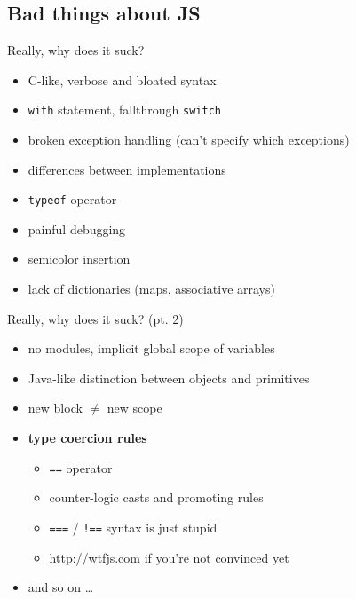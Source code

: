 \documentclass[xcolor=dvipsnames]{beamer}
\newcommand{\slide}[1]{\begin{frame}[fragile]{{#1}}}
\newcommand{\epic}[1]{\textbf{\huge{{#1}}}}
\begin{document}
\subsection{Bad things about JS}

\slide{Really, why does it suck?}

    \begin{itemize}
        \item C-like, verbose and bloated syntax
        \item \verb+with+ statement, fallthrough \verb+switch+
        \item broken exception handling (can't specify which exceptions)
        \item differences between implementations
        \item \verb+typeof+ operator
        \item painful debugging
        \item semicolor insertion
        \item lack of dictionaries (maps, associative arrays)
    \end{itemize}
\end{frame}


\slide{Really, why does it suck? (pt. 2)}
    \begin{itemize}
        \item no modules, implicit global scope of variables
        \item Java-like distinction between objects and primitives
        \item new block $\not=$ new scope   %

        \pause

        \item \epic{type coercion rules}
            \begin{itemize}
                \item \verb+==+ operator
                \item counter-logic casts and promoting rules
                \item \verb+===+ / \verb+!==+ syntax is just stupid
                \item \url{http://wtfjs.com} if you're not convinced yet
            \end{itemize}
        \item and so on \ldots
    \end{itemize}
\end{frame}
\end{document}
